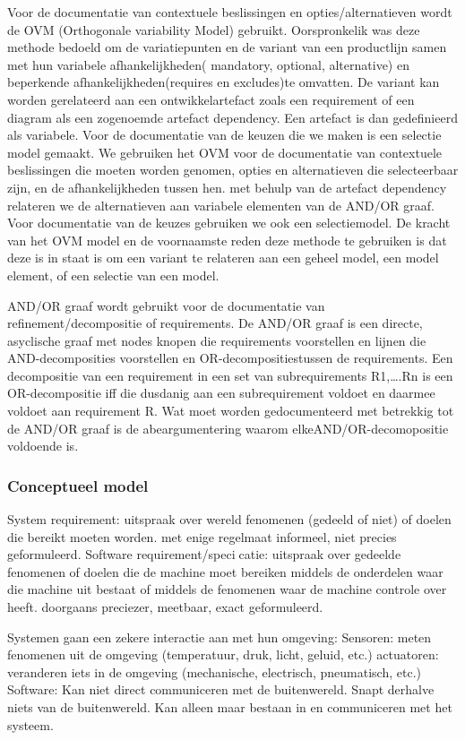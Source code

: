 Voor de documentatie van contextuele beslissingen en opties/alternatieven wordt de OVM (Orthogonale variability Model) gebruikt. Oorspronkelik was deze methode bedoeld om de variatiepunten en de variant van een productlijn samen met hun variabele afhankelijkheden( mandatory, optional, alternative)  en beperkende afhankelijkheden(requires en excludes)te omvatten. De variant kan worden gerelateerd aan een ontwikkelartefact zoals een requirement of een diagram als een zogenoemde artefact dependency. Een artefact is dan gedefinieerd als variabele. Voor de documentatie van de keuzen die we maken is een selectie model gemaakt. We gebruiken het OVM voor de documentatie van contextuele beslissingen die moeten worden genomen, opties en alternatieven die selecteerbaar zijn, en de afhankelijkheden tussen hen. met behulp van de artefact dependency relateren we de alternatieven aan variabele elementen van de AND/OR graaf. Voor documentatie van de keuzes gebruiken we ook een selectiemodel. De kracht van het OVM model en de voornaamste reden deze methode te gebruiken is dat deze is in staat is om een variant te relateren aan een geheel model, een model element, of een selectie van een model. 

AND/OR graaf wordt gebruikt voor de documentatie van refinement/decompositie of requirements. De AND/OR graaf is een directe, asyclische graaf met nodes knopen die requirements voorstellen en lijnen die AND-decomposities voorstellen en OR-decompositiestussen de requirements. Een decompositie van een requirement in een set van subrequirements R1,….Rn is een OR-decompositie iff die dusdanig aan een subrequirement voldoet en daarmee voldoet aan requirement R. Wat moet worden gedocumenteerd met betrekkig tot de AND/OR graaf is de abeargumentering waarom elkeAND/OR-decomopositie  voldoende is. 
\subsubsection{Conceptueel model}



System requirement:
uitspraak over wereld fenomenen (gedeeld of niet) of doelen
die bereikt moeten worden.
met enige regelmaat informeel, niet precies geformuleerd.
Software requirement/specicatie:
uitspraak over gedeelde fenomenen of doelen die de machine
moet bereiken middels de onderdelen waar die machine uit
bestaat of middels de fenomenen waar de machine controle
over heeft.
doorgaans preciezer, meetbaar, exact geformuleerd.


Systemen gaan een zekere interactie aan met hun omgeving:
Sensoren: meten fenomenen uit de omgeving (temperatuur,
druk, licht, geluid, etc.)
actuatoren: veranderen iets in de omgeving (mechanische,
electrisch, pneumatisch, etc.)
Software:
Kan niet direct communiceren met de buitenwereld.
Snapt derhalve niets van de buitenwereld.
Kan alleen maar bestaan in en communiceren met het
systeem.











